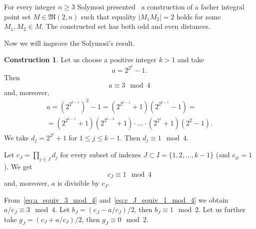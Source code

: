 \documentclass[a4paper,14pt]{article} %
\theoremstyle{plain}
\theoremstyle{definition}
\newtheorem{construction}[theorem]{Construction}
\begin{document}
For every integer $n\geq 3$ Solymosi presented~\cite{solymosi2003note} a construction of a facher integral point set
$M\in\mathfrak{M}(2,n)$
such that equality $|M_1 M_2| = 2$ holds for some $M_1, M_2 \in M$.
The constructed set has both odd and even distances.

Now we will improve the Solymosi's result.

\begin{construction}
	\label{con:planar_set_with_minimeter_1}
	Let us choose a positive integer $k > 1$ and take
	\begin{equation}
		a = 2^{2^k} - 1
		.
	\end{equation}
	Then
	\begin{equation}
		\label{eq:a_equiv_3_mod_4}
		a \equiv 3 \mod 4
	\end{equation}
	and, moreover,
	\begin{multline}
		a = \left(2^{2^{k-1}}\right)^2 - 1
		=
		\left(2^{2^{k-1}} + 1\right) \left(2^{2^{k-1}} - 1\right)
		=
		\\=
		\left(2^{2^{k-1}} + 1\right) \left(2^{2^{k-2}} + 1\right) \cdot ... \cdot \left(2^{2^1} + 1\right) \left(2^2 - 1\right)
		.
	\end{multline}
	We take $d_j = 2^{2^j} + 1$ for $1 \leq j \leq k-1$.
	Then $d_j \equiv 1 \mod 4$.

	Let $c_J = \prod_{j\in J} d_j$ for every subset of indexes $J\subset I = \{1,2,...,k-1\}$
	(and  $c_\varnothing = 1$).
	We get
	\begin{equation}
		\label{eq:c_J_equiv_1_mod_4}
		c_J\equiv 1 \mod{4}
	\end{equation}
	and, moreover, $a$ is divisible by $c_J$.


	From~\eqref{eq:a_equiv_3_mod_4} and~\eqref{eq:c_J_equiv_1_mod_4} we obtain $a/c_J \equiv 3 \mod 4$.
	Let $b_J = (c_J - a/c_J)/2$, then $b_J \equiv 1 \mod 2$.
	Let us further take $g_J = (c_J + a/c_J)/2$, then $g_J \equiv 0 \mod 2$.


\end{construction}
\end{document}
